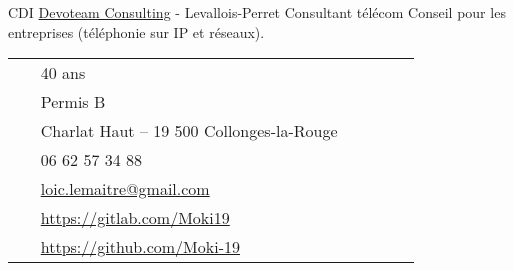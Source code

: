 \documentclass[10pt]{article} %
\begin{document}
\begin{paracol}{2}
  {CDI} %
  {\href{https://devoteam.com/}{Devoteam Consulting} {\small- Levallois-Perret}} %
  {Consultant télécom} %
  {Conseil pour les entreprises (téléphonie sur IP et réseaux).} %


  \vspace{-\baselineskip}\medskip %

  \switchcolumn%


  \parbox[top][0.12\textheight][c]{\linewidth}{ %
    \vspace{-0.04\textheight} %
    \colorbox{shade}{ %
      \begin{supertabular}{p{0.05\linewidth}|p{0.775\linewidth}} %
        \raisebox{0pt}{\faMale} & 40 ans \\ %
        \raisebox{-1pt}{\small\faCar} & Permis B \\ %
        \raisebox{-1pt}{\faHome} & Charlat Haut -- 19 500 Collonges-la-Rouge \\ %
        \raisebox{-1pt}{\faPhone} & 06 62 57 34 88 \\ %
        \raisebox{0pt}{\small\faEnvelope} & \href{mailto:loic.lemaitre@gmail.com}{loic.lemaitre@gmail.com} \\ %
        \raisebox{-1pt}{\small\faGitlab} & \href{https://gitlab.com/Moki19}{https://gitlab.com/Moki19} \\ %
        \raisebox{-1pt}{\small\faGithub} & \href{https://github.com/Moki-19}{https://github.com/Moki-19} \\ %
      \end{supertabular}
    }
  }


\end{paracol}
\end{document}
